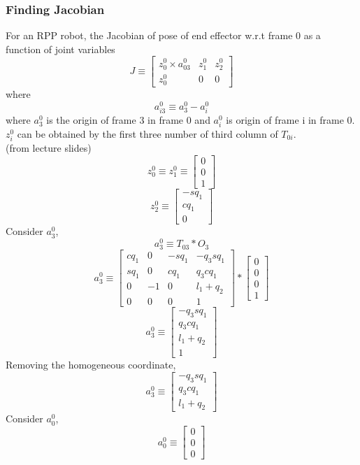 \documentclass[12pt]{article}
\newcommand{\fromlectures}{{\\ \color{blue} \hspace*{\fill}(from lecture slides)} \\}
\begin{document}
\subsubsection*{Finding Jacobian}
For an RPP robot, the Jacobian of pose of end effector w.r.t frame 0 as a function of joint variables
\[
  J \equiv
  \begin{bmatrix}
    z_0^0 \times a_{03}^0 & z_1^0 & z_2^0 \\
    z_0^0 & 0 & 0
  \end{bmatrix}
\]
where
\[
  a_{i3}^{0} \equiv a_{3}^{0} - a_{i}^{0}
\]
where $a_3^0$ is the origin of frame 3 in frame 0 and $a_i^0$ is origin of frame i in frame 0.
$z_i^0$ can be obtained by the first three number of third column of $T_{0i}$.
\fromlectures
\[
  z_0^0 \equiv z_1^0 \equiv \begin{bmatrix}
    0 \\
    0 \\
    1
  \end{bmatrix}
\]
\[
  z_2^0 \equiv
  \begin{bmatrix}
    -sq_1 \\
     cq_1 \\
     0
  \end{bmatrix}
\]
Consider $a_3^0$,
\[
  a_3^0 \equiv T_{03} * O_3
\]
\[
  a_3^0 \equiv
  \begin{bmatrix}
    cq_1 & 0 & -sq_1 & -q_3sq_1 \\
    sq_1 & 0 &  cq_1 &  q_3cq_1 \\
    0 & -1 & 0 & l_1 + q_2 \\
    0 & 0 & 0 & 1
  \end{bmatrix}
  *
  \begin{bmatrix}
    0 \\
    0 \\
    0 \\
    1
  \end{bmatrix}
\]
\[
  a_3^0 \equiv
  \begin{bmatrix}
    -q_3sq_1 \\
    q_3cq_1 \\
    l_1 + q_2 \\
    1
  \end{bmatrix}
\]
Removing the homogeneous coordinate,
\[
  a_3^0 \equiv
  \begin{bmatrix}
    -q_3sq_1 \\
    q_3cq_1 \\
    l_1 + q_2
  \end{bmatrix}
\]
Consider $a_0^0$,
\[
  a_0^0 \equiv \begin{bmatrix}
    0 \\
    0 \\
    0
  \end{bmatrix}
\]
\end{document}
